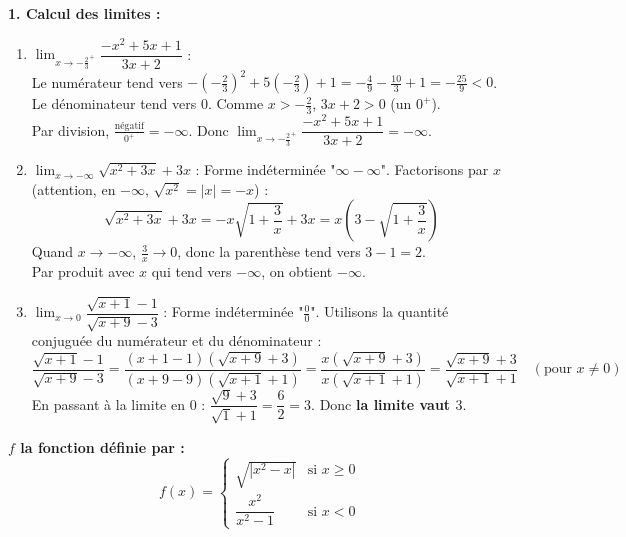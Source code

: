 \documentclass[12pt,a4paper]{article}
\begin{document}
\noindent \textbf{1. Calcul des limites :}
\begin{enumerate}
    \item[\textbf{a)}] $\lim_{x\rightarrow-\frac{2}{3}^{+}}\dfrac{-x^{2}+5x+1}{3x+2}$ : \\
    Le numérateur tend vers $-\left(-\frac{2}{3}\right)^2+5\left(-\frac{2}{3}\right)+1 = -\frac{4}{9}-\frac{10}{3}+1 = -\frac{25}{9} < 0$.\\
    Le dénominateur tend vers $0$. Comme $x > -\frac{2}{3}$, $3x+2 > 0$ (un $0^+$).\\
    Par division, $\frac{\text{négatif}}{0^+} = -\infty$. Donc \textbf{$\lim_{x\rightarrow-\frac{2}{3}^{+}}\dfrac{-x^{2}+5x+1}{3x+2} = -\infty$}.
    
    \item[\textbf{b)}] $\lim_{x\rightarrow-\infty}\sqrt{x^{2}+3x}+3x$ : Forme indéterminée "$\infty - \infty$". Factorisons par $x$ (attention, en $-\infty$, $\sqrt{x^2} = |x| = -x$) :
    \[ \sqrt{x^{2}+3x}+3x = -x\sqrt{1+\frac{3}{x}} + 3x = x\left(3 - \sqrt{1+\frac{3}{x}}\right) \]
    Quand $x \to -\infty$, $\frac{3}{x} \to 0$, donc la parenthèse tend vers $3 - 1 = 2$.\\
    Par produit avec $x$ qui tend vers $-\infty$, on obtient \textbf{$-\infty$}.
    
    \item[\textbf{c)}] $\lim_{x\rightarrow0}\dfrac{\sqrt{x+1}-1}{\sqrt{x+9}-3}$ : Forme indéterminée "$\frac{0}{0}$". Utilisons la quantité conjuguée du numérateur et du dénominateur :
    \[ \frac{\sqrt{x+1}-1}{\sqrt{x+9}-3} = \frac{(x+1-1)(\sqrt{x+9}+3)}{(x+9-9)(\sqrt{x+1}+1)} = \frac{x(\sqrt{x+9}+3)}{x(\sqrt{x+1}+1)} = \frac{\sqrt{x+9}+3}{\sqrt{x+1}+1} \quad (\text{pour } x \neq 0) \]
    En passant à la limite en 0 : $\dfrac{\sqrt{9}+3}{\sqrt{1}+1} = \dfrac{6}{2} = 3$. Donc \textbf{la limite vaut $3$}.
\end{enumerate}

\textbf{ $f$ la fonction définie par :}
\[ f(x)=\begin{cases}
\sqrt{|x^{2}-x|} & \text{si } x\ge0 \\ 
\dfrac{x^{2}}{x^{2}-1} & \text{si } x<0
\end{cases} \]
\end{document}
